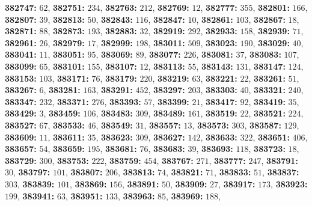 \textsf{\bfseries 382747:} $62$, \textsf{\bfseries 382751:} $234$, \textsf{\bfseries 382763:} $212$, \textsf{\bfseries 382769:} $12$, \textsf{\bfseries 382777:} $355$, \textsf{\bfseries 382801:} $166$, \textsf{\bfseries 382807:} $39$, \textsf{\bfseries 382813:} $50$, \textsf{\bfseries 382843:} $116$, \textsf{\bfseries 382847:} $10$, \textsf{\bfseries 382861:} $103$, \textsf{\bfseries 382867:} $18$, \textsf{\bfseries 382871:} $88$, \textsf{\bfseries 382873:} $193$, \textsf{\bfseries 382883:} $32$, \textsf{\bfseries 382919:} $292$, \textsf{\bfseries 382933:} $158$, \textsf{\bfseries 382939:} $71$, \textsf{\bfseries 382961:} $26$, \textsf{\bfseries 382979:} $17$, \textsf{\bfseries 382999:} $198$, \textsf{\bfseries 383011:} $509$, \textsf{\bfseries 383023:} $190$, \textsf{\bfseries 383029:} $40$, \textsf{\bfseries 383041:} $11$, \textsf{\bfseries 383051:} $95$, \textsf{\bfseries 383069:} $89$, \textsf{\bfseries 383077:} $226$, \textsf{\bfseries 383081:} $37$, \textsf{\bfseries 383083:} $107$, \textsf{\bfseries 383099:} $65$, \textsf{\bfseries 383101:} $155$, \textsf{\bfseries 383107:} $12$, \textsf{\bfseries 383113:} $55$, \textsf{\bfseries 383143:} $131$, \textsf{\bfseries 383147:} $124$, \textsf{\bfseries 383153:} $103$, \textsf{\bfseries 383171:} $76$, \textsf{\bfseries 383179:} $220$, \textsf{\bfseries 383219:} $63$, \textsf{\bfseries 383221:} $22$, \textsf{\bfseries 383261:} $51$, \textsf{\bfseries 383267:} $6$, \textsf{\bfseries 383281:} $163$, \textsf{\bfseries 383291:} $452$, \textsf{\bfseries 383297:} $203$, \textsf{\bfseries 383303:} $40$, \textsf{\bfseries 383321:} $240$, \textsf{\bfseries 383347:} $232$, \textsf{\bfseries 383371:} $276$, \textsf{\bfseries 383393:} $57$, \textsf{\bfseries 383399:} $21$, \textsf{\bfseries 383417:} $92$, \textsf{\bfseries 383419:} $35$, \textsf{\bfseries 383429:} $3$, \textsf{\bfseries 383459:} $106$, \textsf{\bfseries 383483:} $309$, \textsf{\bfseries 383489:} $161$, \textsf{\bfseries 383519:} $22$, \textsf{\bfseries 383521:} $224$, \textsf{\bfseries 383527:} $67$, \textsf{\bfseries 383533:} $46$, \textsf{\bfseries 383549:} $31$, \textsf{\bfseries 383557:} $13$, \textsf{\bfseries 383573:} $303$, \textsf{\bfseries 383587:} $129$, \textsf{\bfseries 383609:} $11$, \textsf{\bfseries 383611:} $35$, \textsf{\bfseries 383623:} $309$, \textsf{\bfseries 383627:} $142$, \textsf{\bfseries 383633:} $322$, \textsf{\bfseries 383651:} $406$, \textsf{\bfseries 383657:} $54$, \textsf{\bfseries 383659:} $195$, \textsf{\bfseries 383681:} $76$, \textsf{\bfseries 383683:} $39$, \textsf{\bfseries 383693:} $118$, \textsf{\bfseries 383723:} $18$, \textsf{\bfseries 383729:} $300$, \textsf{\bfseries 383753:} $222$, \textsf{\bfseries 383759:} $454$, \textsf{\bfseries 383767:} $271$, \textsf{\bfseries 383777:} $247$, \textsf{\bfseries 383791:} $30$, \textsf{\bfseries 383797:} $101$, \textsf{\bfseries 383807:} $206$, \textsf{\bfseries 383813:} $74$, \textsf{\bfseries 383821:} $71$, \textsf{\bfseries 383833:} $51$, \textsf{\bfseries 383837:} $303$, \textsf{\bfseries 383839:} $101$, \textsf{\bfseries 383869:} $156$, \textsf{\bfseries 383891:} $50$, \textsf{\bfseries 383909:} $27$, \textsf{\bfseries 383917:} $173$, \textsf{\bfseries 383923:} $199$, \textsf{\bfseries 383941:} $63$, \textsf{\bfseries 383951:} $133$, \textsf{\bfseries 383963:} $85$, \textsf{\bfseries 383969:} $188$, 
